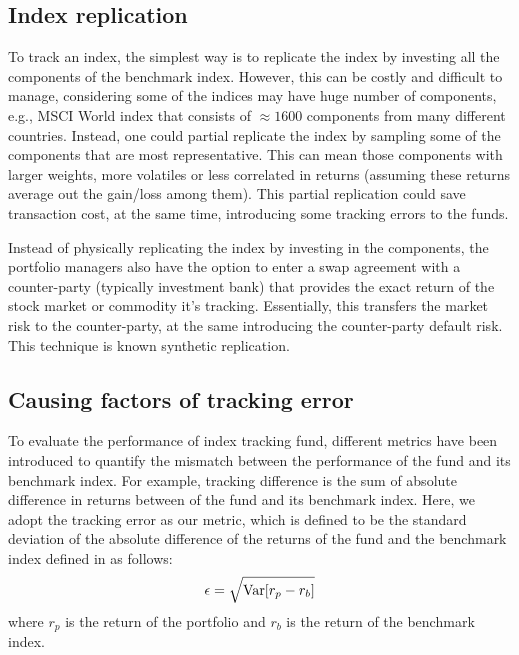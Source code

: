 \subsection{Index replication}
\label{sec:replication}
To track an index, the simplest way is to replicate the index by investing all the components of the benchmark index. However, this can be costly and difficult to manage, considering some of the indices may have huge number of components, e.g., MSCI World index that consists of $\approx 1600$ components from many different countries. Instead, one could partial replicate the index by sampling some of the components that are most representative. This can mean those components with larger weights, more volatiles or less correlated in returns (assuming these returns average out the gain/loss among them). This partial replication could save transaction cost, at the same time, introducing some tracking errors to the funds.
 
Instead of physically replicating the index by investing in the components, the portfolio managers also have the option to enter a swap agreement with a counter-party (typically investment bank) that provides the exact return of the stock market or commodity it's tracking. Essentially, this transfers the market risk to the counter-party, at the same introducing the counter-party default risk. This technique is known synthetic replication.
 
\subsection{Causing factors of tracking error}
To evaluate the performance of index tracking fund, different metrics have been introduced to quantify the mismatch between the performance of the fund and its benchmark index. For example, tracking difference is the sum of absolute difference in returns between of the fund and its benchmark index. Here, we adopt the tracking error as our metric, which is defined to be the standard deviation of the absolute difference of the returns of the fund and the benchmark index defined in \cite{BJ13} as follows:
\begin{equation}
  \epsilon = \sqrt{\operatorname{{\mathrm{Var}}}[r_p - r_b]}
\end{equation}
where $r_p$ is the return of the portfolio and $r_b$ is the return of the benchmark index.
 

